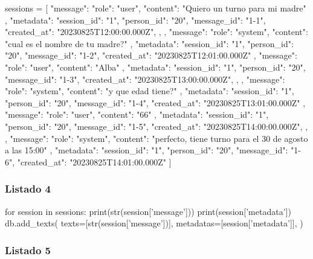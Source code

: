 \begin{APACode}
sessions = [
    {
        "message": {
            "role": "user",
            "content": "Quiero un turno para mi madre"
        },
        "metadata": {
            "session_id": "1",
            "person_id": "20",
            "message_id": "1-1",
            "created_at": "20230825T12:00:00.000Z",
        },
    },
    {
        "message": {
            "role": "system",
            "content": "cual es el nombre de tu madre?"
        },
        "metadata": {
            "session_id": "1",
            "person_id": "20",
            "message_id": "1-2",
            "created_at": "20230825T12:01:00.000Z"
        }
    },
    {
        "message": {
            "role": "user",
            "content": "Alba"
        },
        "metadata": {
            "session_id": "1",
            "person_id": "20",
            "message_id": "1-3",
            "created_at": "20230825T13:00:00.000Z",
        },
    },
    {
        "message": {
            "role": "system",
            "content": "y que edad tiene?"
        },
        "metadata": {
            "session_id": "1",
            "person_id": "20",
            "message_id": "1-4",
            "created_at": "20230825T13:01:00.000Z"
        }
    },
    {
        "message": {
            "role": "user",
            "content": "66"
        },
        "metadata": {
            "session_id": "1",
            "person_id": "20",
            "message_id": "1-5",
            "created_at": "20230825T14:00:00.000Z",
        },
    },
    {
        "message": {
            "role": "system",
            "content": "perfecto, tiene turno para el 30 de agosto a las 15:00"
        },
        "metadata": {
            "session_id": "1",
            "person_id": "20",
            "message_id": "1-6",
            "created_at": "20230825T14:01:00.000Z"
        }
    }
]
\end{APACode}

\subsubsection{Listado 4}
\label{anexo:code-4-1-6-4}

\begin{APACode}
for session in sessions:
    print(str(session['message']))
    print(session['metadata'])
    db.add_texts(
        texts=[str(session['message'])],
        metadatas=[session['metadata']],
    )
\end{APACode}

\subsubsection{Listado 5}
\label{anexo:code-4-1-6-5}

